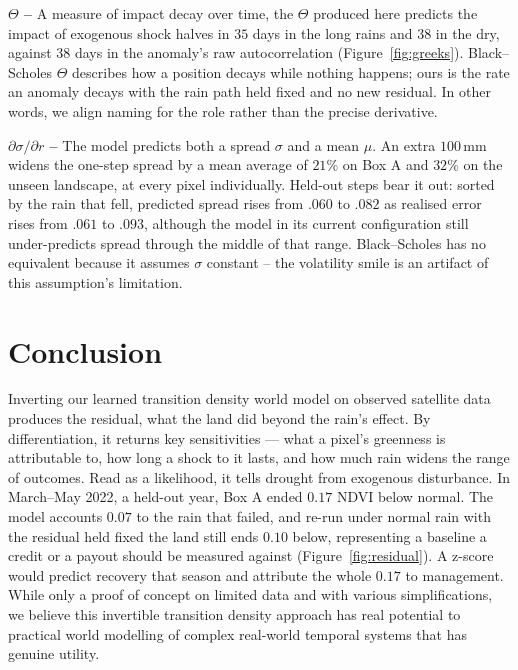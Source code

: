 \documentclass{article}
\begin{document}
\textbf{$\Theta$ -- } A measure of impact decay over time, the $\Theta$ produced here predicts the impact of exogenous shock halves in $35$ days in the long rains and $38$ in the dry, against $38$ days in the anomaly's raw autocorrelation (Figure~\ref{fig:greeks}). Black--Scholes $\Theta$ describes how a position decays while nothing happens; ours is the rate an anomaly decays with the rain path held fixed and no new residual. In other words, we align naming for the role rather than the precise derivative.

\textbf{$\partial\sigma/\partial r$ -- } The model predicts both a spread $\sigma$ and a mean $\mu$. An extra $100$\,mm widens the one-step spread by a mean average of $21\%$ on Box A and $32\%$ on the unseen landscape, at every pixel individually. Held-out steps bear it out: sorted by the rain that fell, predicted spread rises from $.060$ to $.082$ as realised error rises from $.061$ to $.093$, although the model in its current configuration still under-predicts spread through the middle of that range. Black--Scholes has no equivalent because it assumes $\sigma$ constant -- the volatility smile \citep{rubinstein1994,dupire1994} is an artifact of this assumption's limitation.


\section{Conclusion}
Inverting our learned transition density world model on observed satellite data produces the residual, what the land did beyond the rain's effect. By differentiation, it returns key sensitivities --- what a pixel's greenness is attributable to, how long a shock to it lasts, and how much rain widens the range of outcomes. Read as a likelihood, it tells drought from exogenous disturbance. In March--May 2022, a held-out year, Box A ended $0.17$ NDVI below normal. The model accounts $0.07$ to the rain that failed, and re-run under normal rain with the residual held fixed the land still ends $0.10$ below, representing a baseline a credit or a payout should be measured against (Figure~\ref{fig:residual}). A z-score would predict recovery that season and attribute the whole $0.17$ to management. While only a proof of concept on limited data and with various simplifications, we believe this invertible transition density approach has real potential to practical world modelling of complex real-world temporal systems that has genuine utility.
\end{document}
